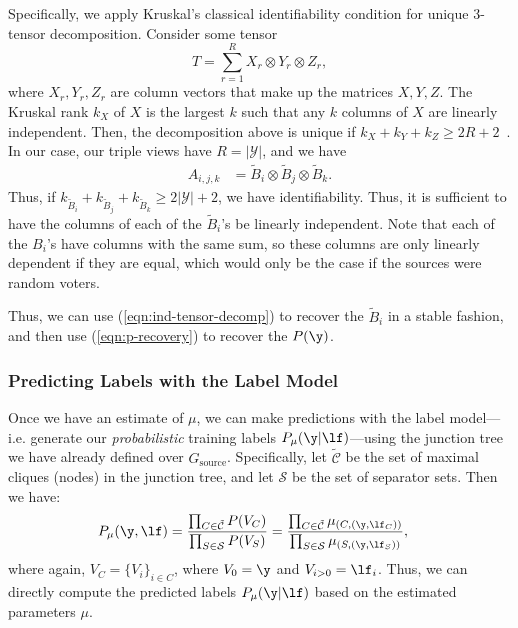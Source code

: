 \documentclass[letterpaper]{article}
\begin{document}
\begin{appendix}
Specifically, we apply Kruskal's classical identifiability condition for unique 3-tensor decomposition.
Consider some tensor 
\[T = \sum_{r=1}^R X_r \otimes Y_r \otimes Z_r,\]
where $X_r, Y_r, Z_r$ are column vectors that make up the matrices $X, Y, Z$. 
The Kruskal rank $k_X$ of $X$ is the largest $k$ such that any $k$ columns of $X$ are linearly independent.
Then, the decomposition above is unique if $k_X + k_Y + k_Z \geq 2R+2$~\cite{kruskal77, bhaskara14}.
In our case, our triple views have $R=|\mathcal{Y}|$, and we have
\begin{align}
	\label{eqn:ind-tensor-decomp}
	A_{i,j,k}
	&=
	\tilde{B}_i \otimes \tilde{B}_j \otimes \tilde{B}_k.
\end{align}
Thus, if $k_{\tilde{B}_i} + k_{\tilde{B}_j} + k_{\tilde{B}_k} \geq 2|\mathcal{Y}| + 2$, we have identifiability.
Thus, it is sufficient to have the columns of each of the $\tilde{B}_i$'s be linearly independent.
Note that each of the $B_i$'s have columns with the same sum, so these columns are only linearly dependent if they are equal, which would only be the case if the sources were random voters.

Thus, we can use (\ref{eqn:ind-tensor-decomp}) to recover the $\tilde{B}_i$ in a stable fashion, and then use (\ref{eqn:p-recovery}) to recover the $P(\y)$.

\subsubsection{Predicting Labels with the Label Model}
\label{appendix:label-model-predictions}
Once we have an estimate of $\mu$, we can make predictions with the label model---i.e. generate our \textit{probabilistic} training labels $P_\mu(\y|\lf)$---using the junction tree we have already defined over $G_{\text{source}}$.
Specifically, let $\tilde{\mathcal{C}}$ be the set of maximal cliques (nodes) in the junction tree, and let $\mathcal{S}$ be the set of separator sets.
Then we have:
\begin{align*}
	P_\mu(\y, \lf)
	&=
	\frac{
		\prod_{C \in \tilde{\mathcal{C}}} P(V_C)
	}{
		\prod_{S \in \mathcal{S}} P(V_S)
	}
	=
	\frac{
		\prod_{C \in \tilde{\mathcal{C}}} \mu_{(C, (\y,\lf_C))}
	}{
		\prod_{S \in \mathcal{S}} \mu_{(S, (\y,\lf_S))}
	},
\end{align*}
where again, $V_C = \{ V_i \}_{i \in C}$, where $V_0 = \y$ and $V_{i>0} = \lf_i$.
Thus, we can directly compute the predicted labels $P_\mu(\y|\lf)$ based on the estimated parameters $\mu$.


\end{appendix}
\end{document}
